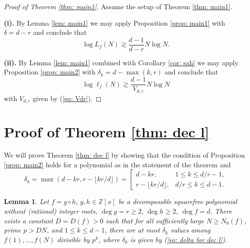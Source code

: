 \documentclass[alphabetic]{amsart}
\newtheorem{lem}[claim]{Lemma}
\theoremstyle{definition}
\numberwithin{equation}{section}
\newcommand{\Z}{{\mathbb Z}}
\numberwithin{equation}{section}
\begin{document}
\begin{proof}[Proof of Theorem \ref{thm: main1}] Assume the setup of Theorem \ref{thm: main1}.

{\bf (i).}
 By Lemma \ref{lem: main1} we may apply Proposition \ref{prop: main1} with $\delta=d-r$ and conclude that
$$\log L_f(N)\gtrsim \frac{d-1}{d-r}N\log N.$$

{\bf (ii).} By Lemma \ref{lem: main1} combined with Corollary \ref{cor: sah} we may apply Proposition \ref{prop: main2} with $\delta_k=d-\max(k,r)$ and conclude that
$$\log \ell_f(N)\gtrsim \frac{d-1}{V_{d,r}}N\log N$$ with $V_{d,r}$ given by (\ref{eq: Vdr}).\end{proof}

\section{Proof of Theorem \ref{thm: dec l}}

We will prove Theorem \ref{thm: dec l} by showing that the condition of Proposition \ref{prop: main2} holds for a polynomial as in the statement of the theorem and 
\begin{equation}\label{eq: delta for dec l}\delta_k=\max(d-kr,r-\lfloor kr/d\rfloor)=\left[\begin{array}{ll}d-kr,&1\le k\le   d/r-1,\\ r-\lfloor kr/d\rfloor,& d/r\le k\le d-1.\,\end{array}\right.\end{equation}

\begin{lem}\label{lem: dec l}
Let $f=g\circ h,\,g,h\in\Z[x]$ be a decomposable squarefree polynomial without (rational) integer roots, $\deg g=r\ge 2,\,\deg h\ge 2$, $\deg f=d$. There exists a constant $D=D(f)>0$ such that for all sufficiently large $N\ge N_0(f)$, prime $p>DN$, and $1\le k\le d-1$, there are at most $\delta_k$ values among $f(1),\ldots,f(N)$ divisible by $p^k$, where $\delta_k$ is given by (\ref{eq: delta for dec l}).
\end{lem}
\end{document}
